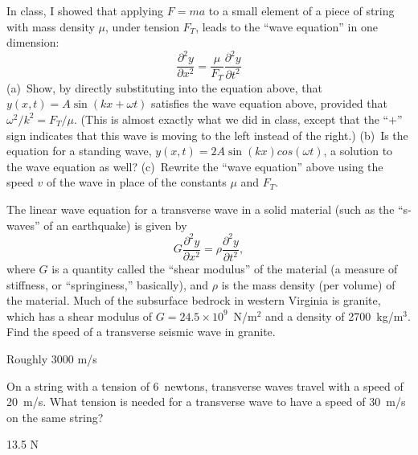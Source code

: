 \begin{Exercise}
In class, I showed that applying $F=ma$ to a small element of a piece of string with mass density $\mu$, under tension $F_T$, leads to the ``wave equation'' in one dimension:
\[ \frac{\partial^2y}{\partial x^2} = \frac{\mu}{F_T}\frac{\partial^2y}{\partial t^2} \]
(a)~Show, by directly substituting into the equation above, that 
$y(x,t)=A\sin(kx+\omega t)$
satisfies the wave equation above, provided that 
$\omega^2/k^2=F_T/\mu$.
(This is almost exactly what we did in class, except that the ``$+$'' sign indicates that this wave is moving to the left instead of the right.) 
(b)~Is the equation for a standing wave, $y(x,t)=2A \sin(kx)cos(\omega t)$, a solution to the wave equation as well?  
(c)~Rewrite the ``wave equation'' above using the speed $v$ of the wave in place of the constants $\mu$ and $F_T$.  
\end{Exercise}


\begin{Exercise}
The linear wave equation for a transverse wave in a solid material (such as the ``s-waves'' of an earthquake) is given by
\[ G\frac{\partial^2y}{\partial x^2} = \rho \frac{\partial^2y}{\partial t^2}, \]
where $G$ is a quantity called the ``shear modulus'' of the material (a measure of stiffness, or ``springiness,'' basically), and $\rho$ is the mass density (per volume) of the material.  Much of the subsurface bedrock in western Virginia is granite, which has a shear modulus of $G=24.5 \times 10^9$~N/m$^2$ and a density of 2700~kg/m$^3$.  
Find the speed of a transverse seismic wave in granite.  
\end{Exercise}
\begin{Answer}
Roughly 3000 m/s
\end{Answer}


\begin{Exercise}
On a string with a tension of 6~newtons, transverse waves travel with a speed of 20~m/s.  What tension is needed for a transverse wave to have a speed of 30~m/s on the same string? 
\end{Exercise}
\begin{Answer}
13.5 N
\end{Answer}

